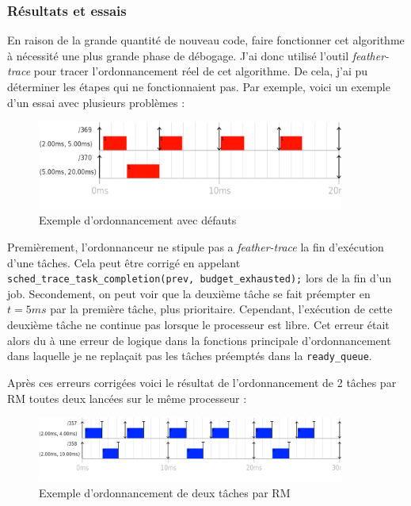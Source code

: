 \subsubsection{Résultats et essais}

En raison de la grande quantité de nouveau code, faire fonctionner cet algorithme à nécessité une plus grande phase de débogage. J'ai donc utilisé l'outil \textit{feather-trace} pour tracer l'ordonnancement réel de cet algorithme. De cela, j'ai pu déterminer les étapes qui ne fonctionnaient pas. Par exemple, voici un exemple d'un essai avec plusieurs problèmes : 
\begin{figure}[H]
    \centering
    \includegraphics[width=0.9\textwidth]{Images/schedule_host=rock960_scheduler=DEMO_trace=notstoped.png}
    \caption{Exemple d'ordonnancement avec défauts}
\end{figure}

Premièrement, l’ordonnanceur ne stipule pas a \textit{feather-trace} la fin d'exécution d'une tâches. Cela peut être corrigé en  appelant \texttt{sched\_trace\_task\_completion(prev, budget\_exhausted);} lors de la fin d'un job.
Secondement, on peut voir que la deuxième tâche se fait préempter en $t=5ms$ par la première tâche, plus prioritaire. Cependant, l'exécution de cette deuxième tâche ne continue pas lorsque le processeur est libre. Cet erreur était alors du à une erreur de logique dans la fonctions principale d’ordonnancement dans laquelle je ne replaçait pas les tâches préemptés dans la \texttt{ready\_queue}.

Après ces erreurs corrigées voici le résultat de l’ordonnancement de 2 tâches par RM toutes deux lancées sur le même processeur :

\begin{figure}[H]
    \centering
    \includegraphics[width=0.9\textwidth]{Images/RM-No-Offset.png}
    \caption{Exemple d'ordonnancement de deux tâches par RM}
    \label{fig:rm-schedualibility-demo}
\end{figure}


